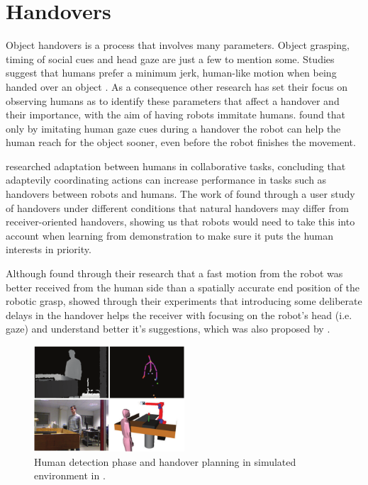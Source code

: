 \section{Handovers}
Object handovers is a process that involves many parameters. Object grasping, timing of social cues and head gaze are just a few to mention some. Studies suggest that humans prefer a minimum jerk, human-like motion when being handed over an object \parencite{Huber2008} \parencite{Huber2008a}. As a consequence other research has set their focus on observing humans as to identify these parameters that affect a handover and their importance, with the aim of having robots immitate humans. \textcite{Moon2014} found that only by imitating human gaze cues during a handover the robot can help the human reach for the object sooner, even before the robot finishes the movement.

\textcite{Huang2015} researched adaptation between humans in collaborative tasks, concluding that adaptevily coordinating actions can increase performance in tasks such as handovers between robots and humans. The work of \textcite{Chan2015} found through a user study of handovers under different conditions that natural handovers may differ from receiver-oriented handovers, showing us that robots would need to take this into account when learning from demonstration to make sure it puts the human interests in priority.

Although \textcite{Koene2014} found through their research that a fast motion from the robot was better received from the human side than a spatially accurate end position of the robotic grasp, \textcite{Admoni2014} showed through their experiments that introducing some deliberate delays in the handover helps the receiver with focusing on the robot's head (i.e. gaze) and understand better it's suggestions, which was also proposed by \parencite{Moon2014}.

\begin{figure}
	\centering
	\includegraphics[width=0.5\textwidth]{img/related-work/planning-simulation.png}
	\caption{Human detection phase and handover planning in simulated environment in \parencite{Aleotti2012}.}
\end{figure}

